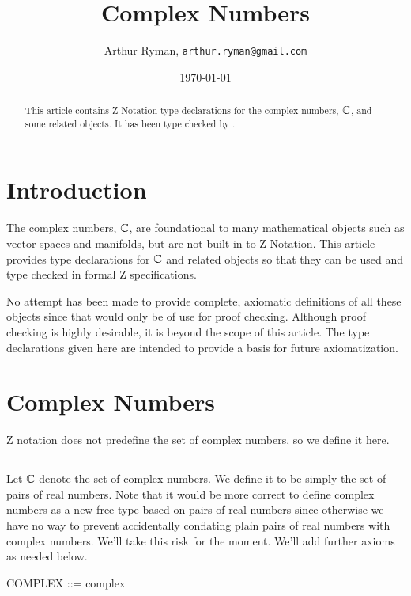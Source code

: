 \documentclass[11pt, oneside]{article}
\title{Complex Numbers}
\author{Arthur Ryman, {\tt arthur.ryman@gmail.com}}
\date{\today}
\begin{document}
\maketitle

\begin{abstract}
This article contains Z Notation type declarations for the complex numbers, $\mathbb{C}$, and some related objects.
It has been type checked by \fuzz.
\end{abstract}

\section{Introduction}

The complex numbers, $\mathbb{C}$, are foundational to many mathematical objects such as vector spaces and manifolds,
but are not built-in to Z Notation.
This article provides type declarations for $\mathbb{C}$ and related objects so that they can be used and type checked in formal Z specifications.

No attempt has been made to provide complete, axiomatic definitions of all these objects since that would only be of use for proof checking.
Although proof checking is highly desirable, it is beyond the scope of this article.
The type declarations given here are intended to provide a basis for future axiomatization.

\section{Complex Numbers}

Z notation does not predefine the set of complex numbers, so we define it here.

\subsection{}

Let $\mathbb{C}$ denote the set of complex numbers.
We define it to be simply the set of pairs of real numbers.
Note that it would be more correct to define complex numbers as a new free type based on
pairs of real numbers since otherwise we have no way to prevent 
accidentally conflating plain pairs of real numbers with complex numbers.
We'll take this risk for the moment.
We'll add further axioms as needed below.

\begin{zed}
	COMPLEX ::= complex \ldata \R \cross \R \rdata
\end{zed}
\end{document}
